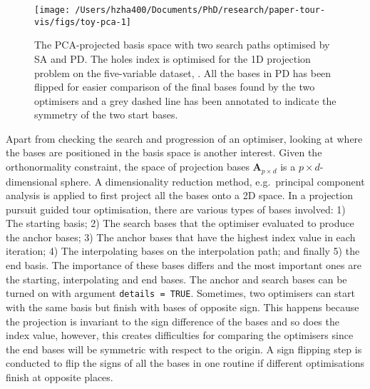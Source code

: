 \begin{Schunk}
\begin{figure}

{\centering \texttt{[image: /Users/hzha400/Documents/PhD/research/paper-tour-vis/figs/toy-pca-1]} 

}

\caption[The PCA-projected basis space with two search paths optimised by SA and PD]{The PCA-projected basis space with two search paths optimised by SA and PD. The holes index is optimised for the 1D projection problem on the five-variable dataset, . All the bases in PD has been flipped for easier comparison of the final bases found by the two optimisers and a grey dashed line has been annotated to indicate the symmetry of the two start bases.}\label{fig:toy-pca}
\end{figure}
\end{Schunk}

Apart from checking the search and progression of an optimiser, looking
at where the bases are positioned in the basis space is another
interest. Given the orthonormality constraint, the space of projection
bases \(\mathbf{A}_{p \times d}\) is a \(p \times d\)-dimensional
sphere. A dimensionality reduction method, e.g.~principal component
analysis is applied to first project all the bases onto a 2D space. In a
projection pursuit guided tour optimisation, there are various types of
bases involved: 1) The starting basis; 2) The search bases that the
optimiser evaluated to produce the anchor bases; 3) The anchor bases
that have the highest index value in each iteration; 4) The
interpolating bases on the interpolation path; and finally 5) the end
basis. The importance of these bases differs and the most important ones
are the starting, interpolating and end bases. The anchor and search
bases can be turned on with argument \texttt{details\ =\ TRUE}.
Sometimes, two optimisers can start with the same basis but finish with
bases of opposite sign. This happens because the projection is invariant
to the sign difference of the bases and so does the index value,
however, this creates difficulties for comparing the optimisers since
the end bases will be symmetric with respect to the origin. A sign
flipping step is conducted to flip the signs of all the bases in one
routine if different optimisations finish at opposite places.

